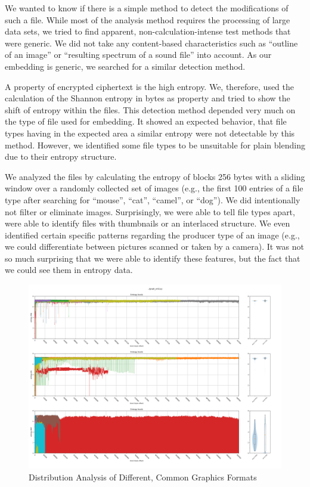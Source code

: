 We wanted to know if there is a simple method to detect the modifications of such a file. While most of the analysis method requires the processing of large data sets, we tried to find apparent, non-calculation-intense test methods that were generic. We did not take any content-based characteristics such as ``outline of an image'' or ``resulting spectrum of a sound file'' into account. As our embedding is generic, we searched for a similar detection method.

A property of encrypted ciphertext is the high entropy. We, therefore, used the calculation of the Shannon entropy in bytes as property and tried to show the shift of entropy within the files. This detection method depended very much on the type of file used for embedding. It showed an expected behavior, that file types having in the expected area a similar entropy were not detectable by this method. However, we identified some file types to be unsuitable for plain blending due to their entropy structure.

We analyzed the files by calculating the entropy of blocks 256 bytes with a sliding window over a randomly collected set of images (e.g., the first 100 entries of a file type after searching for ``mouse'', ``cat'', ``camel'', or ``dog''). We did intentionally not filter or eliminate images. Surprisingly, we were able to tell file types apart, were able to identify files with thumbnails or an interlaced structure. We even identified certain specific patterns regarding the producer type of an image (e.g., we could differentiate between pictures scanned or taken by a camera). It was not so much surprising that we were able to identify these features, but the fact that we could see them in entropy data.

\begin{figure}[ht]
	\includegraphics[width=\textwidth]{inc/statanalysis_graph}
	\caption{Distribution Analysis of Different, Common Graphics Formats}
	\label{fig:statGraph}
\end{figure}

